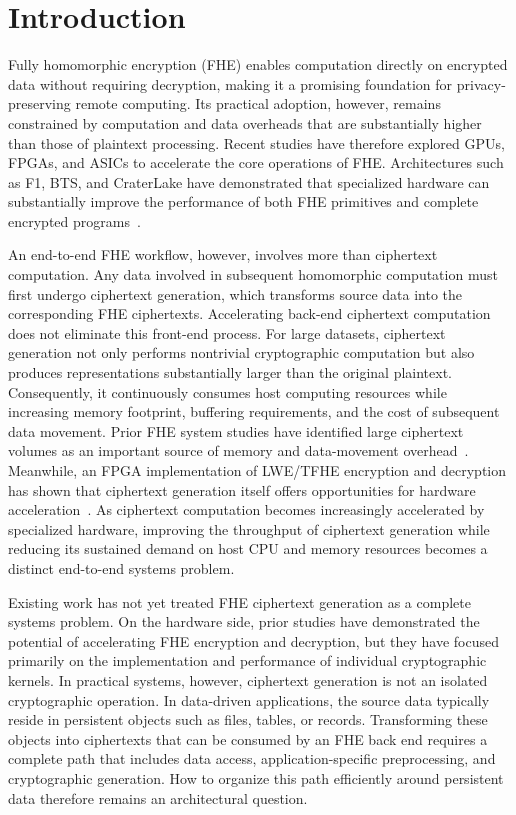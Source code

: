 \documentclass[sigconf,anonymous]{acmart}
\begin{document}
\begingroup
\setlength{\emergencystretch}{1em}
\section{Introduction}
\label{sec:introduction}
Fully homomorphic encryption (FHE) enables computation directly on encrypted data without requiring decryption, making it a promising foundation for privacy-preserving remote computing. Its practical adoption, however, remains constrained by computation and data overheads that are substantially higher than those of plaintext processing. Recent studies have therefore explored GPUs, FPGAs, and ASICs to accelerate the core operations of FHE. Architectures such as F1, BTS, and CraterLake have demonstrated that specialized hardware can substantially improve the performance of both FHE primitives and complete encrypted programs~\cite{f1,bts,craterlake}.

An end-to-end FHE workflow, however, involves more than ciphertext computation. Any data involved in subsequent homomorphic computation must first undergo ciphertext generation, which transforms source data into the corresponding FHE ciphertexts. Accelerating back-end ciphertext computation does not eliminate this front-end process. For large datasets, ciphertext generation not only performs nontrivial cryptographic computation but also produces representations substantially larger than the original plaintext. Consequently, it continuously consumes host computing resources while increasing memory footprint, buffering requirements, and the cost of subsequent data movement. Prior FHE system studies have identified large ciphertext volumes as an important source of memory and data-movement overhead~\cite{f1,craterlake,hera}. Meanwhile, an FPGA implementation of LWE/TFHE encryption and decryption has shown that ciphertext generation itself offers opportunities for hardware acceleration~\cite{feryputri-lwe-fpga}. As ciphertext computation becomes increasingly accelerated by specialized hardware, improving the throughput of ciphertext generation while reducing its sustained demand on host CPU and memory resources becomes a distinct end-to-end systems problem.

Existing work has not yet treated FHE ciphertext generation as a complete systems problem. On the hardware side, prior studies have demonstrated the potential of accelerating FHE encryption and decryption, but they have focused primarily on the implementation and performance of individual cryptographic kernels. In practical systems, however, ciphertext generation is not an isolated cryptographic operation. In data-driven applications, the source data typically reside in persistent objects such as files, tables, or records. Transforming these objects into ciphertexts that can be consumed by an FHE back end requires a complete path that includes data access, application-specific preprocessing, and cryptographic generation. How to organize this path efficiently around persistent data therefore remains an architectural question.
\end{document}
